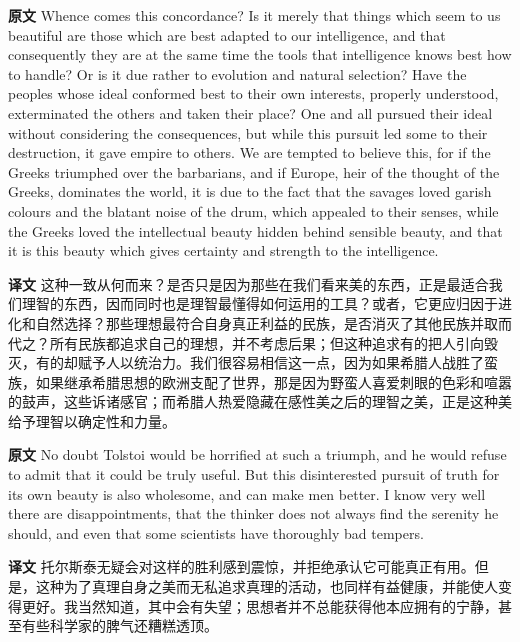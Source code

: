 \documentclass[UTF8,zihao=-4]{ctexart}
\newcommand{\BodyFont}{\fontsize{10.5pt}{15.5pt}\selectfont}
\newcommand{\origlabel}{\textbf{原文}\quad}
\newcommand{\translabel}{\textbf{译文}\quad}
\newenvironment{enblock}{\par\noindent\begingroup\BodyFont\origlabel}{\par\endgroup}
\newenvironment{zhblock}{\par\noindent\begingroup\BodyFont\translabel}{\par\endgroup\vspace{0.35em}}
\begin{document}
\begin{enblock}
Whence comes this concordance? Is it merely that things which seem to us beautiful are those which are best adapted to our intelligence, and that consequently they are at the same time the tools that intelligence knows best how to handle? Or is it due rather to evolution and natural selection? Have the peoples whose ideal conformed best to their own interests, properly understood, exterminated the others and taken their place? One and all pursued their ideal without considering the consequences, but while this pursuit led some to their destruction, it gave empire to others. We are tempted to believe this, for if the Greeks triumphed over the barbarians, and if Europe, heir of the thought of the Greeks, dominates the world, it is due to the fact that the savages loved garish colours and the blatant noise of the drum, which appealed to their senses, while the Greeks loved the intellectual beauty hidden behind sensible beauty, and that it is this beauty which gives certainty and strength to the intelligence.
\end{enblock}
\begin{zhblock}
这种一致从何而来？是否只是因为那些在我们看来美的东西，正是最适合我们理智的东西，因而同时也是理智最懂得如何运用的工具？或者，它更应归因于进化和自然选择？那些理想最符合自身真正利益的民族，是否消灭了其他民族并取而代之？所有民族都追求自己的理想，并不考虑后果；但这种追求有的把人引向毁灭，有的却赋予人以统治力。我们很容易相信这一点，因为如果希腊人战胜了蛮族，如果继承希腊思想的欧洲支配了世界，那是因为野蛮人喜爱刺眼的色彩和喧嚣的鼓声，这些诉诸感官；而希腊人热爱隐藏在感性美之后的理智之美，正是这种美给予理智以确定性和力量。\end{zhblock}

\begin{enblock}
No doubt Tolstoi would be horrified at such a triumph, and he would refuse to admit that it could be truly useful. But this disinterested pursuit of truth for its own beauty is also wholesome, and can make men better. I know very well there are disappointments, that the thinker does not always find the serenity he should, and even that some scientists have thoroughly bad tempers.
\end{enblock}
\begin{zhblock}
托尔斯泰无疑会对这样的胜利感到震惊，并拒绝承认它可能真正有用。但是，这种为了真理自身之美而无私追求真理的活动，也同样有益健康，并能使人变得更好。我当然知道，其中会有失望；思想者并不总能获得他本应拥有的宁静，甚至有些科学家的脾气还糟糕透顶。\end{zhblock}
\end{document}
